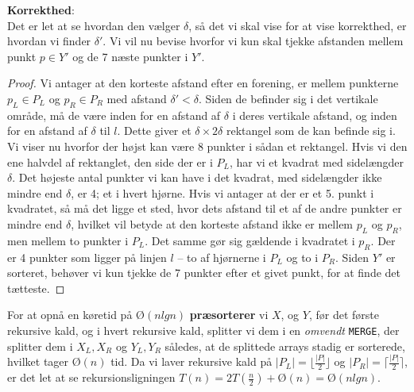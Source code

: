 \textbf{Korrekthed}:\\
Det er let at se hvordan den vælger $\delta$, så det vi skal vise for at vise korrekthed, er hvordan vi finder $\delta'$. Vi vil nu bevise hvorfor vi kun skal tjekke afstanden mellem punkt $p \in Y'$ og de 7 næste punkter i $Y'$.\\
\begin{proof}
  Vi antager at den korteste afstand efter en forening, er mellem punkterne $p_L \in P_L$ og $p_R \in P_R$ med afstand $\delta' < \delta$. Siden de befinder sig i det vertikale område, må de være inden for en afstand af $\delta$ i deres vertikale afstand, og inden for en afstand af $\delta$ til $l$. Dette giver et $\delta \times 2\delta$ rektangel som de kan befinde sig i.\\
  
  Vi viser nu hvorfor der højst kan være 8 punkter i sådan et rektangel. Hvis vi den ene halvdel af rektanglet, den side der er i $P_L$, har vi et kvadrat med sidelængder $\delta$. Det højeste antal punkter vi kan have i det kvadrat, med sidelængder ikke mindre end $\delta$, er 4; et i hvert hjørne. Hvis vi antager at der er et 5. punkt i kvadratet, så må det ligge et sted, hvor dets afstand til et af de andre punkter er mindre end $\delta$, hvilket vil betyde at den korteste afstand ikke er mellem $p_L$ og $p_R$, men mellem to punkter i $P_L$. Det samme gør sig gældende i kvadratet i $p_R$. Der er 4 punkter som ligger på linjen $l$ -- to af hjørnerne i $P_L$ og to i $P_R$. Siden $Y'$ er sorteret, behøver vi kun tjekke de 7 punkter efter et givet punkt, for at finde det tætteste.
\end{proof}

For at opnå en køretid på $Ø(nlgn)$ \textbf{præsorterer} vi $X$, og $Y$, før det første rekursive kald, og i hvert rekursive kald, splitter vi dem i en \emph{omvendt} \texttt{MERGE}, der splitter dem i $X_L, X_R$ og $Y_L, Y_R$ således, at de splittede arrays stadig er sorterede, hvilket tager $Ø(n)$ tid. Da vi laver rekursive kald på $|P_L| = \lfloor \frac{|P|}{2}\rfloor$ og $|P_R| = \lceil \frac{|P|}{2}\rceil$, er det let at se rekursionsligningen $T(n) = 2T(\frac{n}{2}) + Ø(n) = Ø(nlgn)$.


